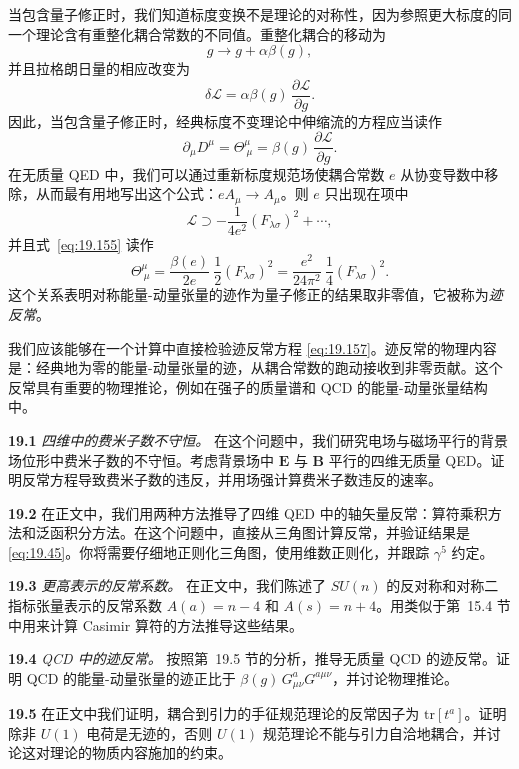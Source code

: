 当包含量子修正时，我们知道标度变换不是理论的对称性，因为参照更大标度的同一个理论含有重整化耦合常数的不同值。重整化耦合的移动为
\begin{equation}
  g \to g + \alpha\beta(g) ,
  \label{eq:19.153}
\end{equation}
并且拉格朗日量的相应改变为
\begin{equation}
  \delta\mathcal{L} = \alpha\beta(g)\,\frac{\partial\mathcal{L}}
    {\partial g} .
  \label{eq:19.154}
\end{equation}
因此，当包含量子修正时，经典标度不变理论中伸缩流的方程应当读作
\begin{equation}
  \partial_\mu D^\mu = \Theta^\mu_{\ \mu} = \beta(g)\,\frac{\partial
    \mathcal{L}}{\partial g} .
  \label{eq:19.155}
\end{equation}
在无质量 QED 中，我们可以通过重新标度规范场使耦合常数 $e$ 从协变导数中移除，从而最有用地写出这个公式：$eA_\mu\to A_\mu$。则 $e$ 只出现在项中
\begin{equation}
  \mathcal{L} \supset -\frac{1}{4e^2}(F_{\lambda\sigma})^2 + \cdots ,
  \label{eq:19.156}
\end{equation}
并且式~\eqref{eq:19.155} 读作
\begin{equation}
  \Theta^\mu_{\ \mu} = \frac{\beta(e)}{2e}\ \frac{1}{2}(F_{\lambda\sigma})^2
  = \frac{e^2}{24\pi^2}\ \frac{1}{4}(F_{\lambda\sigma})^2 .
  \label{eq:19.157}
\end{equation}
这个关系表明对称能量-动量张量的迹作为量子修正的结果取非零值，它被称为\emph{迹反常}。

我们应该能够在一个计算中直接检验迹反常方程 \eqref{eq:19.157}。迹反常的物理内容是：经典地为零的能量-动量张量的迹，从耦合常数的跑动接收到非零贡献。这个反常具有重要的物理推论，例如在强子的质量谱和 QCD 的能量-动量张量结构中。

\problems

\textbf{19.1} \emph{四维中的费米子数不守恒。} 在这个问题中，我们研究电场与磁场平行的背景场位形中费米子数的不守恒。考虑背景场中 $\mathbf{E}$ 与 $\mathbf{B}$ 平行的四维无质量 QED。证明反常方程导致费米子数的违反，并用场强计算费米子数违反的速率。

\textbf{19.2} 在正文中，我们用两种方法推导了四维 QED 中的轴矢量反常：算符乘积方法和泛函积分方法。在这个问题中，直接从三角图计算反常，并验证结果是 \eqref{eq:19.45}。你将需要仔细地正则化三角图，使用维数正则化，并跟踪 $\gamma^5$ 约定。

\textbf{19.3} \emph{更高表示的反常系数。} 在正文中，我们陈述了 $SU(n)$ 的反对称和对称二指标张量表示的反常系数 $A(a) = n-4$ 和 $A(s) = n+4$。用类似于第~15.4 节中用来计算 Casimir 算符的方法推导这些结果。

\textbf{19.4} \emph{QCD 中的迹反常。} 按照第~19.5 节的分析，推导无质量 QCD 的迹反常。证明 QCD 的能量-动量张量的迹正比于 $\beta(g)\,G^a_{\mu\nu}G^{a\mu\nu}$，并讨论物理推论。

\textbf{19.5} 在正文中我们证明，耦合到引力的手征规范理论的反常因子为 $\mathrm{tr}[t^a]$。证明除非 $U(1)$ 电荷是无迹的，否则 $U(1)$ 规范理论不能与引力自洽地耦合，并讨论这对理论的物质内容施加的约束。
